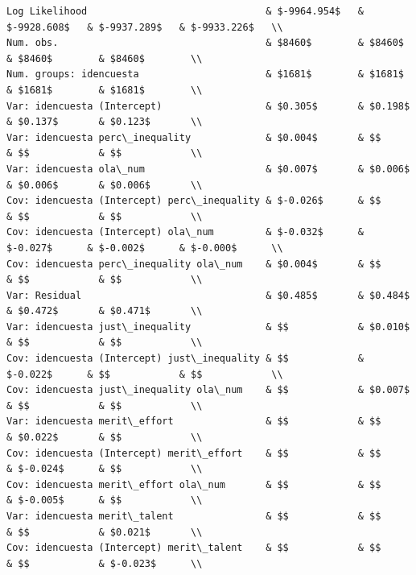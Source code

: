 \documentclass[
  12pt,
]{article}
\begin{document}
\begin{table}
{\begin{verbatim}
Log Likelihood                               & $-9964.954$   & $-9928.608$   & $-9937.289$   & $-9933.226$   \\
Num. obs.                                    & $8460$        & $8460$        & $8460$        & $8460$        \\
Num. groups: idencuesta                      & $1681$        & $1681$        & $1681$        & $1681$        \\
Var: idencuesta (Intercept)                  & $0.305$       & $0.198$       & $0.137$       & $0.123$       \\
Var: idencuesta perc\_inequality             & $0.004$       & $$            & $$            & $$            \\
Var: idencuesta ola\_num                     & $0.007$       & $0.006$       & $0.006$       & $0.006$       \\
Cov: idencuesta (Intercept) perc\_inequality & $-0.026$      & $$            & $$            & $$            \\
Cov: idencuesta (Intercept) ola\_num         & $-0.032$      & $-0.027$      & $-0.002$      & $-0.000$      \\
Cov: idencuesta perc\_inequality ola\_num    & $0.004$       & $$            & $$            & $$            \\
Var: Residual                                & $0.485$       & $0.484$       & $0.472$       & $0.471$       \\
Var: idencuesta just\_inequality             & $$            & $0.010$       & $$            & $$            \\
Cov: idencuesta (Intercept) just\_inequality & $$            & $-0.022$      & $$            & $$            \\
Cov: idencuesta just\_inequality ola\_num    & $$            & $0.007$       & $$            & $$            \\
Var: idencuesta merit\_effort                & $$            & $$            & $0.022$       & $$            \\
Cov: idencuesta (Intercept) merit\_effort    & $$            & $$            & $-0.024$      & $$            \\
Cov: idencuesta merit\_effort ola\_num       & $$            & $$            & $-0.005$      & $$            \\
Var: idencuesta merit\_talent                & $$            & $$            & $$            & $0.021$       \\
Cov: idencuesta (Intercept) merit\_talent    & $$            & $$            & $$            & $-0.023$      \\

\end{verbatim}}
\end{table}
\end{document}
